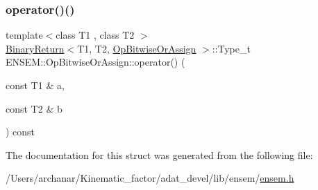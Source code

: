 \mbox{\label{structENSEM_1_1OpBitwiseOrAssign_afddd4ba26f5d21bc671df619c5c4e33b}} 
\subsubsection{\texorpdfstring{operator()()}{operator()()}\hspace{0.1cm}{\footnotesize\ttfamily [2/2]}}
{\footnotesize\ttfamily template$<$class T1 , class T2 $>$ \\
\mbox{\hyperlink{structENSEM_1_1BinaryReturn}{Binary\+Return}}$<$T1, T2, \mbox{\hyperlink{structENSEM_1_1OpBitwiseOrAssign}{Op\+Bitwise\+Or\+Assign}} $>$\+::Type\+\_\+t E\+N\+S\+E\+M\+::\+Op\+Bitwise\+Or\+Assign\+::operator() (\begin{DoxyParamCaption}\item[{const T1 \&}]{a,  }\item[{const T2 \&}]{b }\end{DoxyParamCaption}) const\hspace{0.3cm}{\ttfamily [inline]}}



The documentation for this struct was generated from the following file\+:\begin{DoxyCompactItemize}
\item 
/\+Users/archanar/\+Kinematic\+\_\+factor/adat\+\_\+devel/lib/ensem/\mbox{\hyperlink{lib_2ensem_2ensem_8h}{ensem.\+h}}\end{DoxyCompactItemize}
